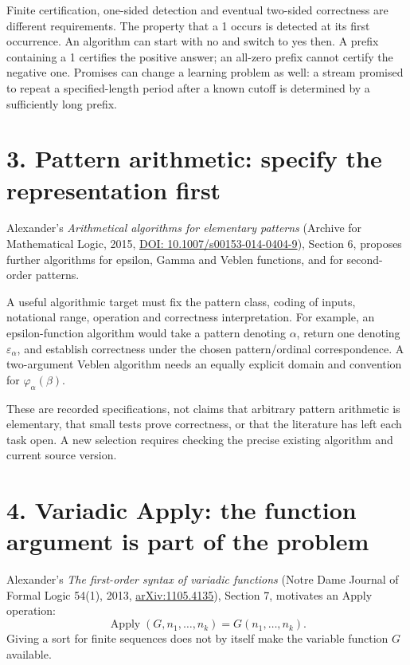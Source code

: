 \documentclass[
  11pt,
  letterpaper,
]{article}
\begin{document}
Finite certification, one-sided detection and eventual two-sided
correctness are different requirements. The property that a 1 occurs is
detected at its first occurrence. An algorithm can start with no and
switch to yes then. A prefix containing a 1 certifies the positive
answer; an all-zero prefix cannot certify the negative one. Promises can
change a learning problem as well: a stream promised to repeat a
specified-length period after a known cutoff is determined by a
sufficiently long prefix.

\section{3. Pattern arithmetic: specify the representation
first}\label{pattern-arithmetic-specify-the-representation-first}

Alexander's \emph{Arithmetical algorithms for elementary patterns}
(Archive for Mathematical Logic, 2015,
\href{https://doi.org/10.1007/s00153-014-0404-9}{DOI:
10.1007/s00153-014-0404-9}), Section 6, proposes further algorithms for
epsilon, Gamma and Veblen functions, and for second-order patterns.

A useful algorithmic target must fix the pattern class, coding of
inputs, notational range, operation and correctness interpretation. For
example, an epsilon-function algorithm would take a pattern denoting
\(\alpha\), return one denoting \(\varepsilon_\alpha\), and establish
correctness under the chosen pattern/ordinal correspondence. A
two-argument Veblen algorithm needs an equally explicit domain and
convention for \(\varphi_\alpha(\beta)\).

These are recorded specifications, not claims that arbitrary pattern
arithmetic is elementary, that small tests prove correctness, or that
the literature has left each task open. A new selection requires
checking the precise existing algorithm and current source version.

\section{4. Variadic Apply: the function argument is part of the
problem}\label{variadic-apply-the-function-argument-is-part-of-the-problem}

Alexander's \emph{The first-order syntax of variadic functions} (Notre
Dame Journal of Formal Logic 54(1), 2013,
\href{https://arxiv.org/abs/1105.4135}{arXiv:1105.4135}), Section 7,
motivates an Apply operation: \[
                \operatorname{Apply}(G,n_1,\ldots,n_k)
                           =G(n_1,\ldots,n_k).
\] Giving a sort for finite sequences does not by itself make the
variable function \(G\) available.
\end{document}
